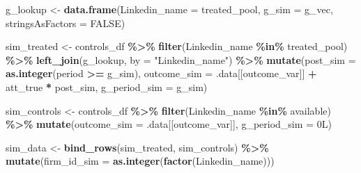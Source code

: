 \documentclass[
]{article}
\newenvironment{Shaded}{\begin{snugshade}}{\end{snugshade}}
\newcommand{\AttributeTok}[1]{\textcolor[rgb]{0.13,0.29,0.53}{#1}}
\newcommand{\ConstantTok}[1]{\textcolor[rgb]{0.56,0.35,0.01}{#1}}
\newcommand{\DataTypeTok}[1]{\textcolor[rgb]{0.13,0.29,0.53}{#1}}
\newcommand{\DecValTok}[1]{\textcolor[rgb]{0.00,0.00,0.81}{#1}}
\newcommand{\FunctionTok}[1]{\textcolor[rgb]{0.13,0.29,0.53}{\textbf{#1}}}
\newcommand{\NormalTok}[1]{#1}
\newcommand{\OtherTok}[1]{\textcolor[rgb]{0.56,0.35,0.01}{#1}}
\newcommand{\SpecialCharTok}[1]{\textcolor[rgb]{0.81,0.36,0.00}{\textbf{#1}}}
\newcommand{\StringTok}[1]{\textcolor[rgb]{0.31,0.60,0.02}{#1}}
\begin{document}
\begin{Shaded}
\begin{Highlighting}[]
\NormalTok{    g\_lookup }\OtherTok{\textless{}{-}} \FunctionTok{data.frame}\NormalTok{(}\AttributeTok{Linkedin\_name =}\NormalTok{ treated\_pool,}
                           \AttributeTok{g\_sim =}\NormalTok{ g\_vec,}
                           \AttributeTok{stringsAsFactors =} \ConstantTok{FALSE}\NormalTok{)}

\NormalTok{    sim\_treated }\OtherTok{\textless{}{-}}\NormalTok{ controls\_df }\SpecialCharTok{\%\textgreater{}\%}
      \FunctionTok{filter}\NormalTok{(Linkedin\_name }\SpecialCharTok{\%in\%}\NormalTok{ treated\_pool) }\SpecialCharTok{\%\textgreater{}\%}
      \FunctionTok{left\_join}\NormalTok{(g\_lookup, }\AttributeTok{by =} \StringTok{"Linkedin\_name"}\NormalTok{) }\SpecialCharTok{\%\textgreater{}\%}
      \FunctionTok{mutate}\NormalTok{(}\AttributeTok{post\_sim     =} \FunctionTok{as.integer}\NormalTok{(period }\SpecialCharTok{\textgreater{}=}\NormalTok{ g\_sim),}
             \AttributeTok{outcome\_sim  =}\NormalTok{ .data[[outcome\_var]] }\SpecialCharTok{+}\NormalTok{ att\_true }\SpecialCharTok{*}\NormalTok{ post\_sim,}
             \AttributeTok{g\_period\_sim =}\NormalTok{ g\_sim)}

\NormalTok{    sim\_controls }\OtherTok{\textless{}{-}}\NormalTok{ controls\_df }\SpecialCharTok{\%\textgreater{}\%}
      \FunctionTok{filter}\NormalTok{(Linkedin\_name }\SpecialCharTok{\%in\%}\NormalTok{ available) }\SpecialCharTok{\%\textgreater{}\%}
      \FunctionTok{mutate}\NormalTok{(}\AttributeTok{outcome\_sim  =}\NormalTok{ .data[[outcome\_var]],}
             \AttributeTok{g\_period\_sim =} \DecValTok{0}\DataTypeTok{L}\NormalTok{)}

\NormalTok{    sim\_data }\OtherTok{\textless{}{-}} \FunctionTok{bind\_rows}\NormalTok{(sim\_treated, sim\_controls) }\SpecialCharTok{\%\textgreater{}\%}
      \FunctionTok{mutate}\NormalTok{(}\AttributeTok{firm\_id\_sim =} \FunctionTok{as.integer}\NormalTok{(}\FunctionTok{factor}\NormalTok{(Linkedin\_name)))}


\end{Highlighting}
\end{Shaded}
\end{document}
